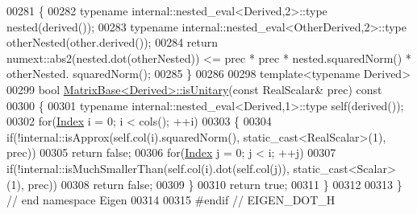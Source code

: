 \begin{DoxyCode}
00281 \textcolor{keyword}{}\{
00282   \textcolor{keyword}{typename} internal::nested\_eval<Derived,2>::type nested(derived());
00283   \textcolor{keyword}{typename} internal::nested\_eval<OtherDerived,2>::type otherNested(other.derived());
00284   \textcolor{keywordflow}{return} numext::abs2(nested.dot(otherNested)) <= prec * prec * nested.squaredNorm() * otherNested.
      squaredNorm();
00285 \}
00286 
00298 \textcolor{keyword}{template}<\textcolor{keyword}{typename} Derived>
00299 \textcolor{keywordtype}{bool} \hyperlink{group___core___module_a8a7ee34ce202cac3eeea9cf20c9e4833}{MatrixBase<Derived>::isUnitary}(\textcolor{keyword}{const} RealScalar& prec)\textcolor{keyword}{ const}
00300 \textcolor{keyword}{}\{
00301   \textcolor{keyword}{typename} internal::nested\_eval<Derived,1>::type \textcolor{keyword}{self}(derived());
00302   \textcolor{keywordflow}{for}(\hyperlink{namespace_eigen_a62e77e0933482dafde8fe197d9a2cfde}{Index} i = 0; i < cols(); ++i)
00303   \{
00304     \textcolor{keywordflow}{if}(!internal::isApprox(\textcolor{keyword}{self}.col(i).squaredNorm(), static\_cast<RealScalar>(1), prec))
00305       \textcolor{keywordflow}{return} \textcolor{keyword}{false};
00306     \textcolor{keywordflow}{for}(\hyperlink{namespace_eigen_a62e77e0933482dafde8fe197d9a2cfde}{Index} j = 0; j < i; ++j)
00307       \textcolor{keywordflow}{if}(!internal::isMuchSmallerThan(\textcolor{keyword}{self}.col(i).dot(\textcolor{keyword}{self}.col(j)), static\_cast<Scalar>(1), prec))
00308         \textcolor{keywordflow}{return} \textcolor{keyword}{false};
00309   \}
00310   \textcolor{keywordflow}{return} \textcolor{keyword}{true};
00311 \}
00312 
00313 \} \textcolor{comment}{// end namespace Eigen}
00314 
00315 \textcolor{preprocessor}{#endif // EIGEN\_DOT\_H}
\end{DoxyCode}

